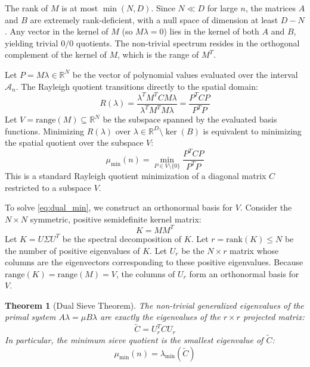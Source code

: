 \documentclass[10pt,twoside]{article}
\newtheorem{theorem}{Theorem}[section]
\newcommand{\mathcalA}{\mathcal{A}}
\begin{document}
The rank of $M$ is at most $\min(N, D)$. Since $N \ll D$ for large $n$, the matrices $A$ and $B$ are extremely rank-deficient, with a null space of dimension at least $D - N$. Any vector in the kernel of $M$ (so $M\lambda = 0$) lies in the kernel of both $A$ and $B$, yielding trivial $0/0$ quotients. The non-trivial spectrum resides in the orthogonal complement of the kernel of $M$, which is the range of $M^T$.

Let $P = M \lambda \in \mathbb{R}^N$ be the vector of polynomial values evaluated over the interval $\mathcalA_n$. The Rayleigh quotient transitions directly to the spatial domain:
\begin{equation}
R(\lambda) = \frac{\lambda^T M^T C M \lambda}{\lambda^T M^T M \lambda} = \frac{P^T C P}{P^T P}
\end{equation}
Let $V = \text{range}(M) \subseteq \mathbb{R}^N$ be the subspace spanned by the evaluated basis functions. Minimizing $R(\lambda)$ over $\lambda \in \mathbb{R}^D \setminus \ker(B)$ is equivalent to minimizing the spatial quotient over the subspace $V$:
\begin{equation} \label{eq:dual_min}
\mu_{\min}(n) = \min_{P \in V \setminus \{0\}} \frac{P^T C P}{P^T P}
\end{equation}
This is a standard Rayleigh quotient minimization of a diagonal matrix $C$ restricted to a subspace $V$.

To solve \eqref{eq:dual_min}, we construct an orthonormal basis for $V$. Consider the $N \times N$ symmetric, positive semidefinite kernel matrix:
\begin{equation}
K = M M^T
\end{equation}
Let $K = U \Sigma U^T$ be the spectral decomposition of $K$. Let $r = \text{rank}(K) \le N$ be the number of positive eigenvalues of $K$. Let $U_r$ be the $N \times r$ matrix whose columns are the eigenvectors corresponding to these positive eigenvalues. Because $\text{range}(K) = \text{range}(M) = V$, the columns of $U_r$ form an orthonormal basis for $V$.

\begin{theorem}[Dual Sieve Theorem]
The non-trivial generalized eigenvalues of the primal system $A \lambda = \mu B \lambda$ are exactly the eigenvalues of the $r \times r$ projected matrix:
\begin{equation}
\tilde{C} = U_r^T C U_r
\end{equation}
In particular, the minimum sieve quotient is the smallest eigenvalue of $\tilde{C}$:
\begin{equation}
\mu_{\min}(n) = \lambda_{\min}(\tilde{C})
\end{equation}
\end{theorem}
\end{document}
